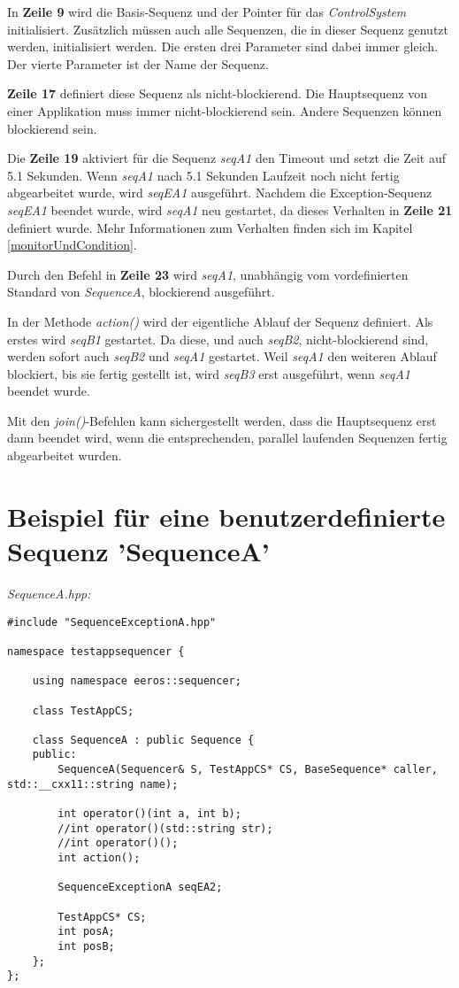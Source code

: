 In \textbf{Zeile 9} wird die Basis-Sequenz und der Pointer für das \textit{ControlSystem} initialisiert.
Zusätzlich müssen auch alle Sequenzen, die in dieser Sequenz genutzt werden, initialisiert werden.
Die ersten drei Parameter sind dabei immer gleich.
Der vierte Parameter ist der Name der Sequenz.

\textbf{Zeile 17} definiert diese Sequenz als nicht-blockierend.
Die Hauptsequenz von einer Applikation muss immer nicht-blockierend sein.
Andere Sequenzen können blockierend sein.

Die \textbf{Zeile 19} aktiviert für die Sequenz \textit{seqA1} den Timeout und setzt die Zeit auf 5.1 Sekunden.
Wenn \textit{seqA1} nach 5.1 Sekunden Laufzeit noch nicht fertig abgearbeitet wurde, wird \textit{seqEA1} ausgeführt.
Nachdem die Exception-Sequenz \textit{seqEA1} beendet wurde, wird \textit{seqA1} neu gestartet, da dieses Verhalten in \textbf{Zeile 21} definiert wurde.
Mehr Informationen zum Verhalten finden sich im Kapitel \ref{monitorUndCondition}.

Durch den Befehl in \textbf{Zeile 23} wird \textit{seqA1}, unabhängig vom vordefinierten Standard von \textit{SequenceA}, blockierend ausgeführt.

In der Methode \textit{action()} wird der eigentliche Ablauf der Sequenz definiert.
Als erstes wird \textit{seqB1} gestartet.
Da diese, und auch \textit{seqB2}, nicht-blockierend sind, werden sofort auch \textit{seqB2} und \textit{seqA1} gestartet.
Weil \textit{seqA1} den weiteren Ablauf blockiert, bis sie fertig gestellt ist, wird \textit{seqB3} erst ausgeführt, wenn \textit{seqA1} beendet wurde.

Mit den \textit{join()}-Befehlen kann sichergestellt werden, dass die Hauptsequenz erst dann beendet wird, wenn die entsprechenden, parallel laufenden Sequenzen fertig abgearbeitet wurden.


\section{Beispiel für eine benutzerdefinierte Sequenz 'SequenceA'}

\textit{SequenceA.hpp:}\
\begin{lstlisting}
#include "SequenceExceptionA.hpp"

namespace testappsequencer {
	
	using namespace eeros::sequencer;
	
	class TestAppCS;
	
	class SequenceA : public Sequence {
	public:
		SequenceA(Sequencer& S, TestAppCS* CS, BaseSequence* caller, std::__cxx11::string name);
		
		int operator()(int a, int b);
		//int operator()(std::string str);
		//int operator()();
		int action();
		
		SequenceExceptionA seqEA2;
		
		TestAppCS* CS;
		int posA;
		int posB;
	};
};
\end{lstlisting}

